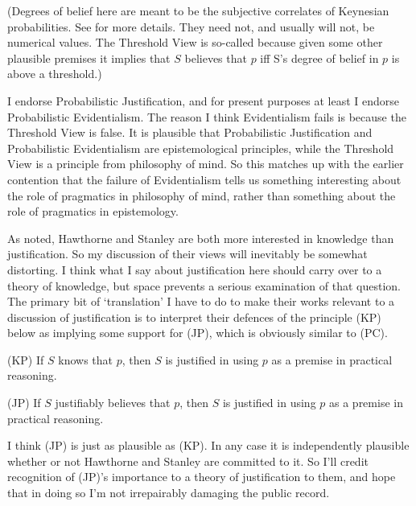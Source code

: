 \noindent (Degrees of belief here are meant to be the subjective correlates of Keynesian probabilities. See \cite{Keynes1921} for more details. They need not, and usually will not, be numerical values. The Threshold View is so-called because given some other plausible premises it implies that \(S\) believes that \(p\) iff S's degree of belief in \(p\) is above a threshold.)

I endorse Probabilistic Justification, and for present purposes at least I endorse Probabilistic Evidentialism. The reason I think Evidentialism fails is because the Threshold View is false. It is plausible that Probabilistic Justification and Probabilistic Evidentialism are epistemological principles, while the Threshold View is a principle from philosophy of mind. So this matches up with the earlier contention that the failure of Evidentialism tells us something interesting about the role of pragmatics in philosophy of mind, rather than something about the role of pragmatics in epistemology.

As noted, Hawthorne and Stanley are both more interested in knowledge than justification. So my discussion of their views will inevitably be somewhat distorting. I think what I say about justification here should carry over to a theory of knowledge, but space prevents a serious examination of that question. The primary bit of `translation' I have to do to make their works relevant to a discussion of justification is to interpret their defences of the principle (KP) below as implying some support for (JP), which is obviously similar to (PC).

\begin{description*}
\item[(KP)] If \(S\)  knows that \(p\), then \(S\)  is justified in using \(p\) as a premise in practical reasoning.
\item[(JP)] If \(S\)  justifiably believes that \(p\), then \(S\)  is justified in using \(p\) as a premise in practical reasoning.
\end{description*}

\noindent I think (JP) is just as plausible as (KP). In any case it is independently plausible whether or not Hawthorne and Stanley are committed to it. So I'll credit recognition of (JP)'s importance to a theory of justification to them, and hope that in doing so I'm not irrepairably damaging the public record.

